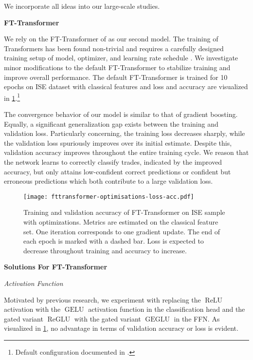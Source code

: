 We incorporate all ideas into our large-scale studies.

\textbf{FT-Transformer}

We rely on the FT-Transformer of \textcite[][4--5]{gorishniyRevisitingDeepLearning2021} as our second model. The training of Transformers has been found non-trivial and requires a carefully designed training setup of model, optimizer, and learning rate schedule \autocite[][1]{liuUnderstandingDifficultyTraining2020}. We investigate minor modifications to the default FT-Transformer to stabilize training and improve overall performance. The default FT-Transformer is trained for 10 epochs on \gls{ISE} dataset with classical features and loss and accuracy are visualized in \cref{fig:fttransformer-optimizations-loss-acc}.\footnote{Default configuration documented in \textcite[][18]{gorishniyRevisitingDeepLearning2021}.}

The convergence behavior of our model is similar to that of gradient boosting. Equally, a significant generalization gap exists between the training and validation loss. Particularly concerning, the training loss decreases sharply, while the validation loss spuriously improves over its initial estimate. Despite this, validation accuracy improves throughout the entire training cycle. We reason that the network learns to correctly classify trades, indicated by the improved accuracy, but only attains low-confident correct predictions or confident but erroneous predictions which both contribute to a large validation loss.

\begin{figure}[!ht]
    \centering
    \texttt{[image: fttransformer-optimisations-loss-acc.pdf]}
    \caption[Training and Validation Accuracy of FT-Transformer with Optimisations]{Training and validation accuracy of FT-Transformer on \gls{ISE} sample with optimizations. Metrics are estimated on the classical feature set. One iteration corresponds to one gradient update. The end of each epoch is marked with a dashed bar. Loss is expected to decrease throughout training and accuracy to increase.}
    \label{fig:fttransformer-optimizations-loss-acc}
\end{figure}

\textbf{Solutions For FT-Transformer}

\emph{Activation Function}

Motivated by previous research, we experiment with replacing the $\operatorname{ReLU}$ activation with the $\operatorname{GELU}$ activation function \autocite[][2]{hendrycksGaussianErrorLinear2020} in the classification head and the gated variant $\operatorname{ReGLU}$ with the gated variant $\operatorname{GEGLU}$ \autocite[][2]{shazeerGLUVariantsImprove2020} in the \gls{FFN}. As visualized in \cref{fig:fttransformer-optimizations-loss-acc}, no advantage in terms of validation accuracy or loss is evident.

